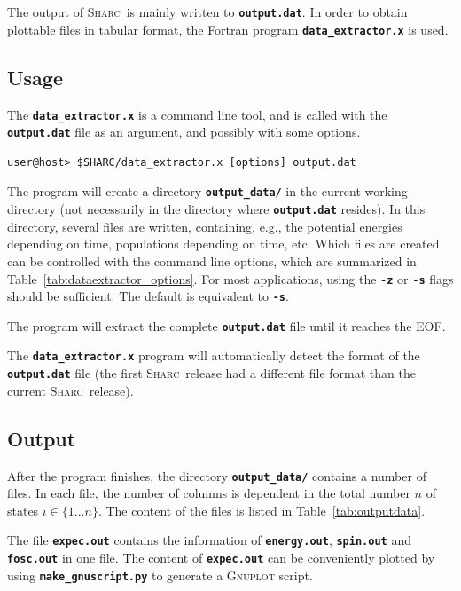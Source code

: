 \documentclass[a4paper,10pt,DIV=15,openany,twoside=false]{scrbook}
\newcommand{\sharc}{\textsc{Sharc}}
\newcommand{\ttt}[1]{\textbf{\texttt{#1}}}
\begin{document}
The output of \sharc\ is mainly written to \ttt{output.dat}. In order to obtain plottable files in tabular format, the Fortran program \ttt{data\_extractor.x} is used.

\subsection{Usage}

The \ttt{data\_extractor.x} is a command line tool, and is called with the \ttt{output.dat} file as an argument, and possibly with some options.
\begin{verbatim}
user@host> $SHARC/data_extractor.x [options] output.dat
\end{verbatim}
The program will create a directory \ttt{output\_data/} in the current working directory (not necessarily in the directory where \ttt{output.dat} resides). In this directory, several files are written, containing, e.g., the potential energies depending on time, populations depending on time, etc.
Which files are created can be controlled with the command line options, which are summarized in Table~\ref{tab:dataextractor_options}. For most applications, using the \ttt{-z} or \ttt{-s} flags should be sufficient. The default is equivalent to \ttt{-s}.

The program will extract the complete \ttt{output.dat} file until it reaches the EOF. 

The \ttt{data\_extractor.x} program will automatically detect the format of the \ttt{output.dat} file (the first \sharc\ release had a different file format than the current \sharc\ release).

\subsection{Output}

After the program finishes, the directory \ttt{output\_data/} contains a number of files. In each file, the number of columns is dependent in the total number $n$ of states $i\in\{1...n\}$. The content of the files is listed in Table~\ref{tab:outputdata}.

The file \ttt{expec.out} contains the information of \ttt{energy.out}, \ttt{spin.out} and \ttt{fosc.out} in one file. The content of \ttt{expec.out} can be conveniently plotted by using \ttt{make\_gnuscript.py} to generate a \textsc{Gnuplot} script.


\end{document}
